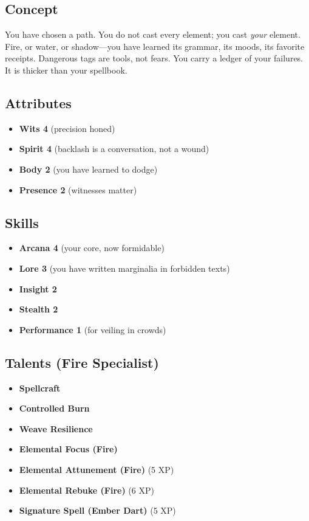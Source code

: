 \subsection{Concept}

You have chosen a path. You do not cast every element; you cast \emph{your} element. Fire, or water, or shadow---you have learned its grammar, its moods, its favorite receipts. Dangerous tags are tools, not fears. You carry a ledger of your failures. It is thicker than your spellbook.

\subsection{Attributes}

\begin{itemize}
    \item \textbf{Wits 4} (precision honed)
    \item \textbf{Spirit 4} (backlash is a conversation, not a wound)
    \item \textbf{Body 2} (you have learned to dodge)
    \item \textbf{Presence 2} (witnesses matter)
\end{itemize}

\subsection{Skills}

\begin{itemize}
    \item \textbf{Arcana 4} (your core, now formidable)
    \item \textbf{Lore 3} (you have written marginalia in forbidden texts)
    \item \textbf{Insight 2}
    \item \textbf{Stealth 2}
    \item \textbf{Performance 1} (for veiling in crowds)
\end{itemize}

\subsection{Talents (Fire Specialist)}

\begin{itemize}
    \item \textbf{Spellcraft}
    \item \textbf{Controlled Burn}
    \item \textbf{Weave Resilience}
    \item \textbf{Elemental Focus (Fire)}
    \item \textbf{Elemental Attunement (Fire)} (5 XP)
    \item \textbf{Elemental Rebuke (Fire)} (6 XP)
    \item \textbf{Signature Spell (Ember Dart)} (5 XP)
\end{itemize}

